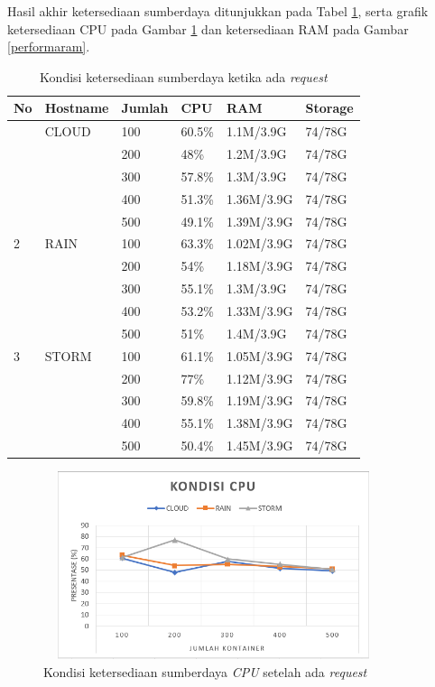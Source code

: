 				Hasil akhir ketersediaan sumberdaya ditunjukkan pada Tabel \ref{sdhasilperforma}, serta grafik ketersediaan CPU pada Gambar \ref{performacpu} dan ketersediaan RAM pada Gambar \ref{performaram}.
				\begin{longtable}{|p{}|p{}|p{}|p{}|p{}|p{}|}
					\caption{Kondisi ketersediaan sumberdaya ketika ada \textit{request}} \label{sdhasilperforma} \\
					\hline
					\textbf{No} & \textbf{Hostname} & \textbf{Jumlah} & \textbf{CPU} & \textbf{RAM} & \textbf{Storage} \\ \hline
					\endhead
					\endfoot
					\endlastfoot
					1 & CLOUD & 100 & 60.5\% & 1.1M/3.9G & 74/78G \\ \cline{3-6}
					&& 200 & 48\% & 1.2M/3.9G & 74/78G \\ \cline{3-6}
					&& 300 & 57.8\% & 1.3M/3.9G & 74/78G \\ \cline{3-6}
					&& 400 & 51.3\% & 1.36M/3.9G & 74/78G \\ \cline{3-6}
					&& 500 & 49.1\% & 1.39M/3.9G & 74/78G \\ \hline
					2 & RAIN & 100 & 63.3\% & 1.02M/3.9G & 74/78G \\ \cline{3-6}
					&& 200 & 54\% & 1.18M/3.9G & 74/78G \\ \cline{3-6}
					&& 300 & 55.1\% & 1.3M/3.9G & 74/78G \\ \cline{3-6}
					&& 400 & 53.2\% & 1.33M/3.9G & 74/78G \\ \cline{3-6}
					&& 500 & 51\% & 1.4M/3.9G & 74/78G \\ \hline
					3 & STORM & 100 & 61.1\% & 1.05M/3.9G & 74/78G \\ \cline{3-6}
					&& 200 & 77\% & 1.12M/3.9G & 74/78G \\ \cline{3-6}
					&& 300 & 59.8\% & 1.19M/3.9G & 74/78G \\ \cline{3-6}
					&& 400 & 55.1\% & 1.38M/3.9G & 74/78G \\ \cline{3-6}
					&& 500 & 50.4\% & 1.45M/3.9G & 74/78G \\ \hline
				\end{longtable}
			
				\begin{figure}[H]
					\centering
					\includegraphics[width=10cm,height=5.5cm]{Images/C-5/performacpu.PNG}
					\caption{Kondisi ketersediaan sumberdaya \textit{CPU} setelah ada \textit{request}}
					\label{performacpu}
				\end{figure}
				
